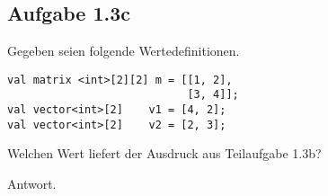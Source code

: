 \documentclass[
  ngerman,
  DIV=14
]{scrartcl}
\begin{document}
\subsection*{Aufgabe 1.3c}
Gegeben seien folgende Wertedefinitionen.
\begin{lstlisting}
val matrix <int>[2][2] m = [[1, 2],
                            [3, 4]];
val vector<int>[2]    v1 = [4, 2];
val vector<int>[2]    v2 = [2, 3];
\end{lstlisting}
Welchen Wert liefert der Ausdruck aus Teilaufgabe 1.3b?

\bigskip\noindent
Antwort.
\end{document}
